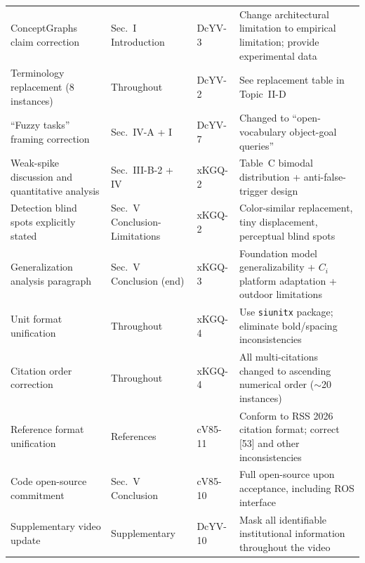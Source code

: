 \documentclass[10pt,a4paper]{article}
\begin{document}
\begin{longtable}{L{3.6cm}L{2.6cm}L{1.8cm}L{5.8cm}}
ConceptGraphs claim correction & Sec.~I Introduction & DcYV-3 & Change architectural limitation to empirical limitation; provide experimental data\\
Terminology replacement (8 instances) & Throughout & DcYV-2 & See replacement table in Topic~II-D\\
``Fuzzy tasks'' framing correction & Sec.~IV-A + I & DcYV-7 & Changed to ``open-vocabulary object-goal queries''\\
Weak-spike discussion and quantitative analysis & Sec.~III-B-2 + IV & xKGQ-2 & Table~C bimodal distribution + anti-false-trigger design\\
Detection blind spots explicitly stated & Sec.~V Conclusion-Limitations & xKGQ-2 & Color-similar replacement, tiny displacement, perceptual blind spots\\
Generalization analysis paragraph & Sec.~V Conclusion (end) & xKGQ-3 & Foundation model generalizability + $C_i$ platform adaptation + outdoor limitations\\
Unit format unification & Throughout & xKGQ-4 & Use \texttt{siunitx} package; eliminate bold/spacing inconsistencies\\
Citation order correction & Throughout & xKGQ-4 & All multi-citations changed to ascending numerical order (${\sim}$20 instances)\\
Reference format unification & References & cV85-11 & Conform to RSS 2026 citation format; correct [53] and other inconsistencies\\
Code open-source commitment & Sec.~V Conclusion & cV85-10 & Full open-source upon acceptance, including ROS interface\\
Supplementary video update & Supplementary & DcYV-10 & Mask all identifiable institutional information throughout the video\\
\end{longtable}
\end{document}
